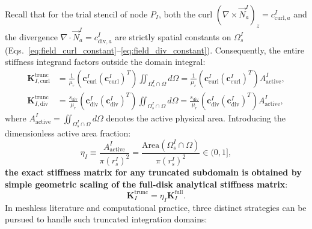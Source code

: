 \documentclass[preprint,12pt]{elsarticle}
\begin{document}
Recall that for the trial stencil of node $P_I$, both the curl $(\nabla \times \vec{N}_a^I)_z = c_{\mathrm{curl}, a}^I$ and the divergence $\nabla \cdot \vec{N}_a^I = c_{\mathrm{div}, a}^I$ are strictly spatial constants on $\Omega_s^I$ (Eqs.~\eqref{eq:field_curl_constant}--\eqref{eq:field_div_constant}). Consequently, the entire stiffness integrand factors outside the domain integral:
\begin{align}
    \mathbf{K}_{I, \mathrm{curl}}^{\mathrm{trunc}} & = \frac{1}{\mu_r} \left( \mathbf{c}_{\mathrm{curl}}^I (\mathbf{c}_{\mathrm{curl}}^I)^T \right) \iint_{\Omega_s^I \cap \Omega} d\Omega = \frac{1}{\mu_r} \left( \mathbf{c}_{\mathrm{curl}}^I (\mathbf{c}_{\mathrm{curl}}^I)^T \right) A_{\mathrm{active}}^I, \label{eq:k_curl_truncated}                          \\
    \mathbf{K}_{I, \mathrm{div}}^{\mathrm{trunc}}  & = \frac{s_{\mathrm{div}}}{\mu_r} \left( \mathbf{c}_{\mathrm{div}}^I (\mathbf{c}_{\mathrm{div}}^I)^T \right) \iint_{\Omega_s^I \cap \Omega} d\Omega = \frac{s_{\mathrm{div}}}{\mu_r} \left( \mathbf{c}_{\mathrm{div}}^I (\mathbf{c}_{\mathrm{div}}^I)^T \right) A_{\mathrm{active}}^I, \label{eq:k_div_truncated}
\end{align}
where $A_{\mathrm{active}}^I = \iint_{\Omega_s^I \cap \Omega} d\Omega$ denotes the active physical area. Introducing the dimensionless active area fraction:
\begin{equation}
    \eta_I \equiv \frac{A_{\mathrm{active}}^I}{\pi (r_s^I)^2} = \frac{\mathrm{Area}(\Omega_s^I \cap \Omega)}{\pi (r_s^I)^2} \in (0, 1],
    \label{eq:area_fraction_eta}
\end{equation}
\textbf{the exact stiffness matrix for any truncated subdomain is obtained by simple geometric scaling of the full-disk analytical stiffness matrix}:
\begin{equation}
    \mathbf{K}_I^{\mathrm{trunc}} = \eta_I \mathbf{K}_I^{\mathrm{full}}.
    \label{eq:k_truncated_scaled}
\end{equation}
In meshless literature and computational practice, three distinct strategies can be pursued to handle such truncated integration domains:
\end{document}
